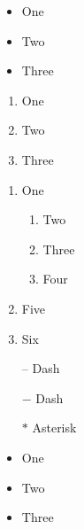 \documentclass{article}
\begin{document}
\begin{itemize}
    \item One
    \item Two
    \item Three
\end{itemize}

\begin{enumerate}
    \item One
    \item Two
    \item Three
\end{enumerate}

\begin{enumerate}
    \item One
    \begin{enumerate}
        \item Two
        \item Three
        \item Four
    \end{enumerate}
    \item Five
    \item Six
\end{enumerate}




\begin{itemize}
    \item[--] Dash
    \item[$-$] Dash
    \item[$\ast$] Asterisk
\end{itemize}




\begin{itemize}[label=$\ast$]
    \item One
    \item Two
    \item Three
\end{itemize}
\end{document}
